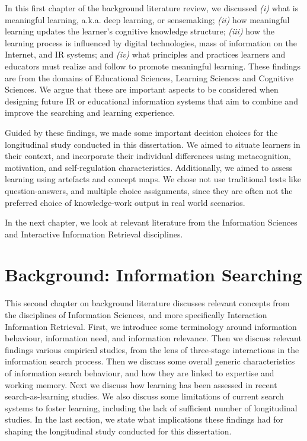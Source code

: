 \documentclass[letterpaper, nobind]{templates/ociamthesis}
\begin{document}
In this first chapter of the background literature review, we discussed
\emph{(i)} what is meaningful learning, a.k.a. deep learning, or sensemaking;
\emph{(ii)} how meaningful learning updates the learner's cognitive knowledge
structure; \emph{(iii)} how the learning process is influenced by digital
technologies, mass of information on the Internet, and IR systems; and
\emph{(iv)} what principles and practices learners and educators must realize
and follow to promote meaningful learning. These findings are from the
domains of Educational Sciences, Learning Sciences and Cognitive
Sciences. We argue that these are important aspects to be considered
when designing future IR or educational information systems that aim to
combine and improve the searching and learning experience.

Guided by these findings, we made some important decision choices for the longitudinal study conducted in this dissertation.
We aimed to situate learners in their context, and incorporate their individual differences using metacognition, motivation, and self-regulation characteristics.
Additionally, we aimed to assess learning using artefacts and concept maps.
We chose not use traditional tests like question-answers, and multiple choice assignments, since they are often not the preferred choice of knowledge-work output in real world scenarios.

In the next chapter, we look at relevant literature from the Information Sciences and Interactive Information Retrieval disciplines.

\hypertarget{ch-bg-search}{%
\chapter{Background: Information Searching}\label{ch-bg-search}}

This second chapter on background literature discusses relevant concepts
from the disciplines of Information Sciences, and more specifically
Interaction Information Retrieval. First, we introduce some terminology
around information behaviour, information need, and information
relevance. Then we discuss relevant findings various empirical studies,
from the lens of three-stage interactions in the information search
process. Then we discuss some overall generic characteristics of
information search behaviour, and how they are linked to expertise and
working memory. Next we discuss how learning has been assessed in recent
search-as-learning studies. We also discuss some limitations of current
search systems to foster learning, including the lack of sufficient
number of longitudinal studies. In the last section, we state what
implications these findings had for shaping the longitudinal study conducted for this
dissertation.
\end{document}
